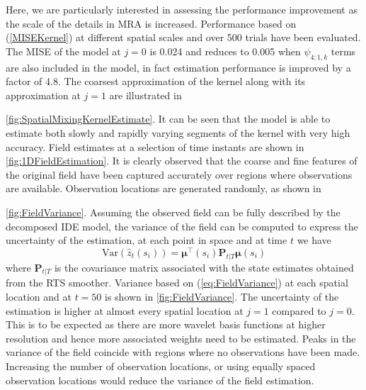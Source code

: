 \documentclass[draftcls,onecolumn]{IEEEtran}
\begin{document}
  Here, we are particularly interested in assessing the performance improvement as the scale of the details in MRA is increased. Performance based on (\ref{MISEKernel}) at different spatial scales and over 500 trials have been evaluated. The MISE of the model at $j=0$ is 0.024 and reduces to 0.005 when $\psi_{4;1,k}$ terms are also included in the model, in fact estimation performance is improved by a factor of 4.8. The coarsest approximation of the kernel along with its approximation at $j=1$ are illustrated in \figurename{\ref{fig:SpatialMixingKernelEstimate}. It can be seen that the model is able to estimate both slowly and rapidly varying segments of the  kernel with very high accuracy.  Field estimates  at a selection of time instants are shown in \figurename{\ref{fig:1DFieldEstimation}}. It is clearly observed that the coarse and fine features of the original field have been captured accurately over regions where observations are available. Observation locations are generated randomly, as shown in \figurename{\ref{fig:FieldVariance}. Assuming the observed field can be fully described by the  decomposed IDE model, the variance of the field can be computed to express the  uncertainty of the estimation, at each point in space and at time $t$ we have 
\begin{equation}
 \text{Var}(\hat z_t(s_i))=\boldsymbol\mu^{\top}(s_i) \mathbf P_{t|T}\boldsymbol\mu(s_i)
\label{eq:FieldVariance}
\end{equation}
where $\mathbf P_{t|T} $ is the covariance matrix associated with the  state estimates obtained from the RTS smoother. Variance based on (\ref{eq:FieldVariance}) at each spatial location and at $t=50$ is shown in \figurename{\ref{fig:FieldVariance}}. The uncertainty of the estimation is higher at almost  every spatial location at $j=1$ compared to $j=0$. This is to be expected as there are more wavelet basis functions at higher resolution and hence more associated weights need to be estimated. Peaks in the variance of the field coincide with regions where no observations have been made. Increasing the number of observation locations, or using equally spaced observation locations would reduce the variance of the field estimation.

}}
\end{document}

